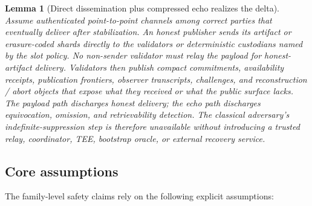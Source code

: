 \documentclass[11pt]{article}
\newtheorem{lemma}{Lemma}
\begin{document}
\begin{lemma}[Direct dissemination plus compressed echo realizes the delta]
\label{lem:direct-dissemination-echo}
Assume authenticated point-to-point channels among correct parties that
eventually deliver after stabilization. An honest publisher sends its artifact
or erasure-coded shards directly to the validators or deterministic custodians
named by the slot policy. No non-sender validator must relay the payload for
honest-artifact delivery. Validators then publish compact commitments,
availability receipts, publication frontiers, observer transcripts, challenges,
and reconstruction / abort objects that expose what they received or what the
public surface lacks. The payload path discharges honest delivery; the echo
path discharges equivocation, omission, and retrievability detection. The
classical adversary's indefinite-suppression step is therefore unavailable
without introducing a trusted relay, coordinator, TEE, bootstrap oracle, or
external recovery service.
\end{lemma}

\subsection{Core assumptions}

The family-level safety claims rely on the following explicit assumptions:
\end{document}
